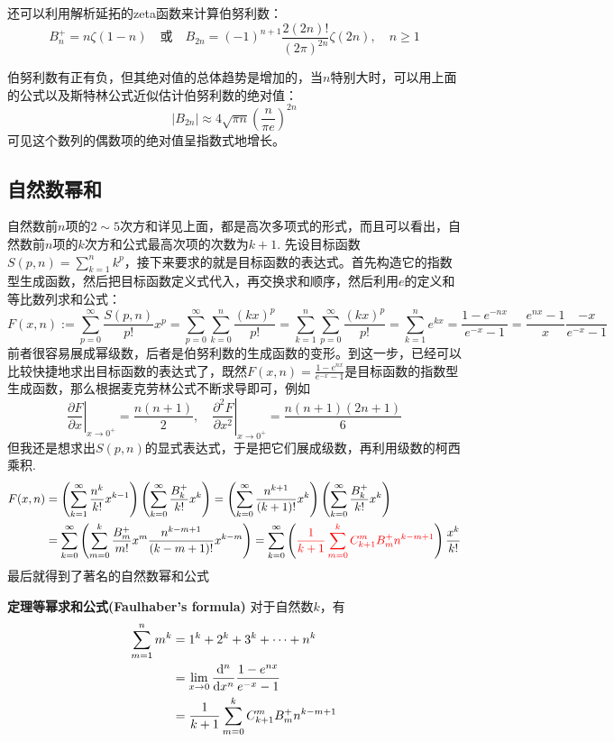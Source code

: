 \documentclass[UTF8]{ctexart}
\newcommand{\trm}[1]{{\rm #1}}
\newenvironment{theorem}[1]
    {\begin{tcolorbox}[enhanced, colback=LightYellow, breakable=true, frame hidden, borderline west={1.5mm}{-2mm}{DarkBlue}]
    {\bfseries {\color{DarkBlue} 定理}\quad #1} \newline}
    {\end{tcolorbox}}
\begin{document}
还可以利用解析延拓的zeta函数来计算伯努利数：
\[ B_n^+ = n\zeta(1-n) \quad \mbox{或} \quad B_{2n} = (-1)^{n+1}\frac{2(2n)!}{(2\pi)^{2n}}\zeta(2n), \quad n \geq 1\]



\par 伯努利数有正有负，但其绝对值的总体趋势是增加的，当\(n\)特别大时，可以用上面的公式以及斯特林公式近似估计伯努利数的绝对值：
\[ | B_{2n} | \approx 4\sqrt{\pi n}\left(\frac{n}{\pi e} \right)^{2n} \]
可见这个数列的偶数项的绝对值呈指数式地增长。

\subsection{自然数幂和}

自然数前\(n\)项的\(2\sim5\)次方和详见上面，都是高次多项式的形式，而且可以看出，自然数前\(n\)项的\(k\)次方和公式最高次项的次数为\(k+1\).
先设目标函数\(S(p,n) = \sum_{k=1}^n k^p\)，接下来要求的就是目标函数的表达式。首先构造它的指数型生成函数，然后把目标函数定义式代入，再交换求和顺序，然后利用\(e\)的定义和等比数列求和公式：
\[ F(x,n) := \sum_{p=0}^{\infty} \frac{S(p,n)}{p!}x^p = \sum_{p=0}^{\infty}\sum_{k=0}^{n}\frac{(kx)^p}{p!} = \sum_{k=1}^{n} \sum_{p=0}^{\infty} \frac{(kx)^p}{p!}  = \sum_{k=1}^{n} e^{kx} = \frac{1-e^{-nx}}{e^{-x}-1} = \frac{e^{nx}-1}{x}\frac{-x}{e^{-x}-1}\]
前者很容易展成幂级数，后者是伯努利数的生成函数的变形。到这一步，已经可以比较快捷地求出目标函数的表达式了，既然\(\displaystyle{F(x,n)=\frac{1-e^{nx}}{e^{-x}-1}}\)是目标函数的指数型生成函数，那么根据麦克劳林公式不断求导即可，例如
\[\displaystyle{\left.\frac{\partial F}{\partial x}\right|_{x \to 0^+} = \frac{n(n+1)}{2}, \quad \left.\frac{\partial^2 F}{\partial x^2}\right|_{x \to 0^+} = \frac{n(n+1)(2n+1)}{6}} \]
但我还是想求出\(S(p,n)\)的显式表达式，于是把它们展成级数，再利用级数的柯西乘积.
\begin{align*}
    F(x,n) &= \left(\sum_{k=1}^{\infty} \frac{n^k}{k!}x^{k-1}\right)\left(\sum_{k=0}^{\infty} \frac{B_k^+}{k!}x^k\right) = \left(\sum_{k=0}^{\infty} \frac{n^{k+1}}{(k+1)!}x^{k}\right)\left(\sum_{k=0}^{\infty} \frac{B_k^+}{k!}x^k\right) \\
    & = \sum_{k=0}^{\infty}\left(\sum_{m=0}^{k} \frac{B_m^+}{m!}x^m\frac{n^{k-m+1}}{(k-m+1)!}x^{k-m}\right) = \sum_{k=0}^{\infty}\left({\color{red} \frac{1}{k+1}\sum_{m=0}^{k}C_{k+1}^m B_m^+ n^{k-m+1}}\right)\frac{x^k}{k!}
\end{align*}
最后就得到了著名的自然数幂和公式
\begin{theorem}{等幂求和公式(Faulhaber's formula)}
    对于自然数\(k\)，有
    \begin{align*}
        \sum_{m=1}^n m^k &= 1^k+2^k+3^k+\cdots+n^k \\
        &= \lim_{x \to 0}\frac{\trm{d}^n}{\trm{d}x^n}\frac{1-e^{nx}}{e^{-x}-1} \\
        &= \frac{1}{k+1}\sum_{m=0}^{k} C_{k+1}^m B_m^+ n^{k-m+1}
    \end{align*}
\end{theorem}
\end{document}
